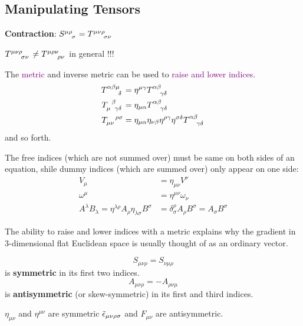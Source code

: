 \subsection{Manipulating Tensors}
\textbf{Contraction}: $\tensor{S}{^{\mu\rho}_\sigma}=\tensor{T}{^{\mu\nu\rho}_{\sigma\nu}}$

$\tensor{T}{^{\mu\nu\rho}_{\sigma\nu}}\neq \tensor{T}{^{\mu\rho\nu}_{\rho\nu}}$ in general !!!

The \textcolor{purple}{metric} and inverse metric can be used to \textcolor{purple}{raise and lower indices}.
\begin{align*}
    \tensor{T}{^{\alpha\beta\mu}_\delta}&=\tensor{\eta}{^{\mu\gamma}}\tensor{T}{^{\alpha\beta}_{\gamma\delta}}\\
    \tensor{T}{_\mu^\beta_{\gamma\delta}}&=\eta_{\mu\alpha}\tensor{T}{^{\alpha\beta}_{\gamma\delta}}\\
    \tensor{T}{_{\mu\nu}^{\rho\sigma}}&=\eta_{\mu\alpha}\eta_{\nu\beta}\eta^{\rho\gamma}\eta^{\sigma\delta}\tensor{T}{^{\alpha\beta}_{\gamma\delta}}
\end{align*}
and so forth.

The free indices (which are not summed over) must be same on both sides of an equation, shile dummy indices (which are summed over) only appear on one side:
\begin{align*}
    V_\mu&=\eta_{\mu\nu}V^\nu\\
    \omega^\mu&=\eta^{\mu\nu}\omega_\nu\\
    A^\lambda B_\lambda=\eta^{\lambda\rho}A_\rho\eta_{\lambda\sigma}B^\sigma&=\delta^\rho_\sigma A_\rho B^\sigma=A_\sigma B^\sigma
\end{align*}

The ability to raise and lower indices with a metric explains why the gradient in $3$-dimensional flat Euclidean space is usually thought of as an ordinary vector.

\begin{equation*}
    S_{\mu\nu\rho}=S_{\nu\mu\rho}
\end{equation*}
is \textbf{symmetric} in its first two indices.
\begin{equation*}
    A_{\mu\nu\rho}=-A_{\rho\nu\mu}
\end{equation*}
is \textbf{antisymmetric} (or skew-symmetric) in its first and third indices.

$\eta_{\mu\nu}$ and $\eta^{\mu\nu}$ are symmetric
$\Tilde{\epsilon}_{\mu\nu\rho\sigma}$ and $F_{\mu\nu}$ are antisymmetric.

